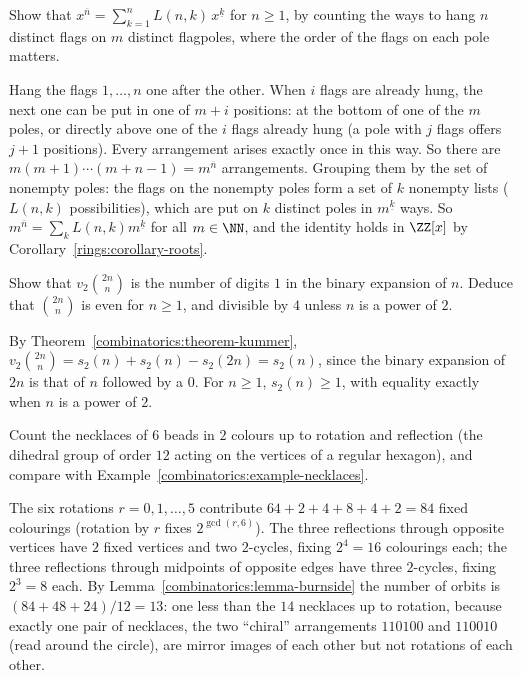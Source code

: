 \begin{exercise}\label{combinatorics:exercise-lah-rising}
Show that $x^{\overline{n}} = \sum_{k=1}^{n}L(n, k)\,x^{\underline{k}}$ for $n \geq 1$, by counting the ways to hang $n$ distinct flags on $m$ distinct flagpoles, where the order of the flags on each
pole matters.
\end{exercise}

\begin{solution}
Hang the flags $1, \ldots, n$ one after the other. When $i$ flags are already hung, the next one can be put in one of $m + i$ positions: at the bottom of one of the $m$ poles, or directly above one of
the $i$ flags already hung (a pole with $j$ flags offers $j + 1$ positions). Every arrangement arises exactly once in this way. So there are $m(m + 1) \cdots (m + n - 1) = m^{\overline{n}}$
arrangements. Grouping them by the set of nonempty poles: the flags on the nonempty poles form a set of $k$ nonempty lists ($L(n, k)$ possibilities), which are put on $k$ distinct poles in
$m^{\underline{k}}$ ways. So $m^{\overline{n}} = \sum_kL(n, k)m^{\underline{k}}$ for all $m \in \NN$, and the identity holds in $\ZZ[x]$ by Corollary~\ref{rings:corollary-roots}.
\end{solution}

\begin{exercise}\label{combinatorics:exercise-central-binomial-two}
Show that $v_2\binom{2n}{n}$ is the number of digits $1$ in the binary expansion of $n$. Deduce that $\binom{2n}{n}$ is even for $n \geq 1$, and divisible by $4$ unless $n$ is a power of $2$.
\end{exercise}

\begin{solution}
By Theorem~\ref{combinatorics:theorem-kummer}, $v_2\binom{2n}{n} = s_2(n) + s_2(n) - s_2(2n) = s_2(n)$, since the binary expansion of $2n$ is that of $n$ followed by a $0$. For $n \geq 1$, $s_2(n) \geq 1$,
with equality exactly when $n$ is a power of $2$.
\end{solution}

\begin{exercise}\label{combinatorics:exercise-bracelets}
Count the necklaces of $6$ beads in $2$ colours up to rotation and reflection (the dihedral group of order $12$ acting on the vertices of a regular hexagon), and compare with
Example~\ref{combinatorics:example-necklaces}.
\end{exercise}

\begin{solution}
The six rotations $r = 0, 1, \ldots, 5$ contribute $64 + 2 + 4 + 8 + 4 + 2 = 84$ fixed colourings (rotation by $r$ fixes $2^{\gcd(r, 6)}$). The three reflections through opposite vertices have $2$ fixed vertices and two
$2$-cycles, fixing $2^4 = 16$ colourings each; the three reflections through midpoints of opposite edges have three $2$-cycles, fixing $2^3 = 8$ each. By Lemma~\ref{combinatorics:lemma-burnside} the
number of orbits is $(84 + 48 + 24)/12 = 13$: one less than the $14$ necklaces up to rotation, because exactly one pair of necklaces, the two ``chiral'' arrangements $110100$ and $110010$ (read around the
circle), are mirror images of each other but not rotations of each other.
\end{solution}

